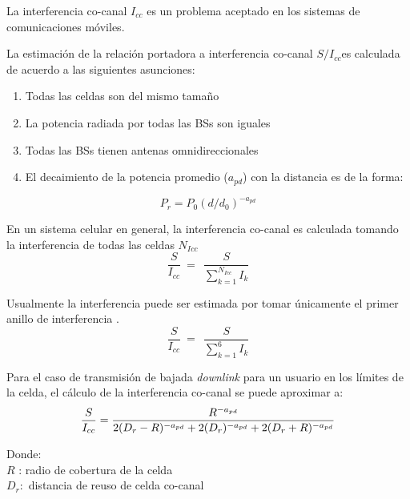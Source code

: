 La interferencia co-canal $I_{cc}$ es un problema aceptado en los sistemas de comunicaciones móviles. \newline

La estimación de la relación portadora a interferencia co-canal ${S}/{I_{cc}}$es calculada de acuerdo  a las siguientes asunciones:

\begin{enumerate}
\item  Todas las celdas son del mismo tamaño
\item  La potencia radiada por todas las BSs son iguales
\item  Todas las BSs tienen antenas omnidireccionales
\item  El decaimiento de la potencia promedio ($a_{pd}$) con la distancia es de la forma:
\end{enumerate}

\begin{equation}
P_r=P_0{(d/d_0)}^{-a_{pd}} 
\label{eqn:P_r}
\end{equation}

En un sistema celular en general, la interferencia co-canal es calculada tomando la interferencia de todas las celdas $N_{Icc}$\newline
\begin{equation}
\frac{S}{I_{cc}}\ =\ \ \frac{S}{\sum^{N_{Icc}}_{k=1}{I_k}} 
\label{eqn:Icc}
\end{equation}

Usualmente la interferencia puede ser estimada por tomar únicamente el primer anillo de interferencia \parencite{Correia2018}.\newline
\begin{equation}
\frac{S}{I_{cc}}\ =\ \ \frac{S}{\sum^6_{k=1}{I_k}} 
\label{eqn:I}
\end{equation}

Para el caso de transmisión de bajada \textit{downlink} para un usuario en los límites de la celda, el cálculo de la interferencia co-canal se puede aproximar a:\newline
\begin{equation}
    \frac{S}{I_{cc}}=\frac{R^{-a_{pd}}}{ 2(D_{r}-R)^{-a_{pd}}+2(D_{r})^{-a_{pd}} + 2(D_{r}+R)^{-a_{pd}}}\\
    \label{eqn:SIcc}
\end{equation}

Donde:\\
$R$ : radio de cobertura de la celda\\
$D_{r}:$ distancia de reuso de celda co-canal\\

